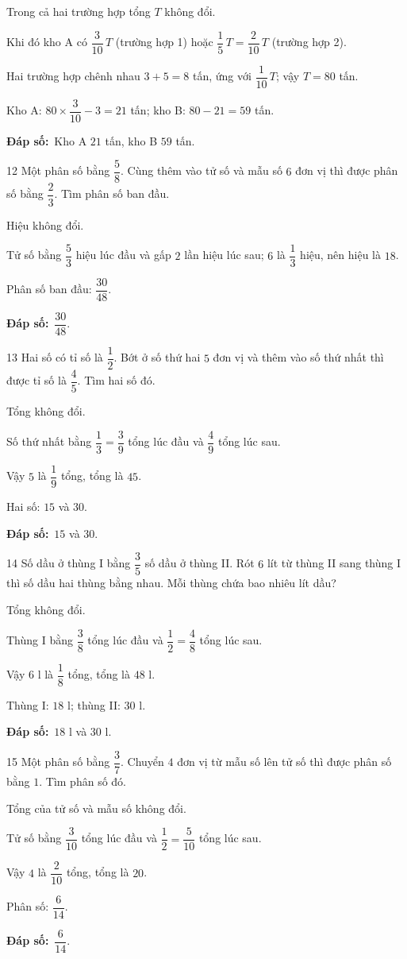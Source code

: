 \documentclass[11pt]{article}
\newif\ifsol \solfalse
\providecommand{\AnsWord}{Đáp số}
\newcommand{\dapso}[1]{\par\textbf{\AnsWord:}\ #1}
\newcommand{\probsol}[1]{%
  \begin{lrbox}{\solmeasure}\begin{minipage}{\dimexpr\linewidth-24pt\relax}#1\end{minipage}\end{lrbox}%
  \ifsol
    \begin{solbox}#1\end{solbox}%
  \else
    \setlength{\solht}{\dimexpr\ht\solmeasure+\dp\solmeasure+0.85cm\relax}%
    \ifdim\solht<1.35cm\setlength{\solht}{1.35cm}\fi
    \begin{tcolorbox}[colback=white,colframe=Line,boxrule=0.8pt,arc=5pt,
      left=8pt,right=8pt,top=4pt,bottom=4pt,height=\solht]{\footnotesize\color{Slate}\itshape\WorkWord}\end{tcolorbox}%
  \fi}
\newcommand{\gap}{\vspace{0.3cm}}
\def\WorkWord{Bài làm:}
\def\AnsWord{Đáp số}
\begin{document}
\probsol{
Trong cả hai trường hợp tổng $T$ không đổi.\par Khi đó kho A có $\dfrac3{10}\,T$ (trường hợp 1) hoặc $\dfrac15\,T=\dfrac2{10}\,T$ (trường hợp 2).\par
Hai trường hợp chênh nhau $3+5=8$ tấn, ứng với $\dfrac1{10}\,T$; vậy $T=80$ tấn.\par
Kho A: $80\times\dfrac3{10}-3=21$ tấn; kho B: $80-21=59$ tấn.
\dapso{Kho A $21$ tấn, kho B $59$ tấn.}}
\gap
\begin{probbox}{12}{\relax}
Một phân số bằng $\dfrac58$. Cùng thêm vào tử số và mẫu số $6$ đơn vị thì được phân số bằng $\dfrac23$. Tìm phân số ban đầu.
\end{probbox}
\probsol{
Hiệu không đổi.\par Tử số bằng $\dfrac53$ hiệu lúc đầu và gấp $2$ lần hiệu lúc sau; $6$ là $\dfrac13$ hiệu, nên hiệu là $18$.\par
Phân số ban đầu: $\dfrac{30}{48}$.
\dapso{$\dfrac{30}{48}$.}}
\gap
\begin{probbox}{13}{\relax}
Hai số có tỉ số là $\dfrac12$. Bớt ở số thứ hai $5$ đơn vị và thêm vào số thứ nhất thì được tỉ số là $\dfrac45$. Tìm hai số đó.
\end{probbox}
\probsol{
Tổng không đổi.\par Số thứ nhất bằng $\dfrac13=\dfrac39$ tổng lúc đầu và $\dfrac49$ tổng lúc sau.\par Vậy $5$ là $\dfrac19$ tổng, tổng là $45$.\par Hai số: $15$ và $30$.
\dapso{$15$ và $30$.}}
\gap
\begin{probbox}{14}{\relax}
Số dầu ở thùng I bằng $\dfrac35$ số dầu ở thùng II. Rót $6$ lít từ thùng II sang thùng I thì số dầu hai thùng bằng nhau. Mỗi thùng chứa bao nhiêu lít dầu?
\end{probbox}
\probsol{
Tổng không đổi.\par Thùng I bằng $\dfrac38$ tổng lúc đầu và $\dfrac12=\dfrac48$ tổng lúc sau.\par Vậy $6$ l là $\dfrac18$ tổng, tổng là $48$ l.\par Thùng I: $18$ l; thùng II: $30$ l.
\dapso{$18$ l và $30$ l.}}
\gap
\begin{probbox}{15}{\relax}
Một phân số bằng $\dfrac37$. Chuyển $4$ đơn vị từ mẫu số lên tử số thì được phân số bằng $1$. Tìm phân số đó.
\end{probbox}
\probsol{
Tổng của tử số và mẫu số không đổi.\par Tử số bằng $\dfrac3{10}$ tổng lúc đầu và $\dfrac12=\dfrac5{10}$ tổng lúc sau.\par Vậy $4$ là $\dfrac2{10}$ tổng, tổng là $20$.\par Phân số: $\dfrac6{14}$.
\dapso{$\dfrac6{14}$.}}
\end{document}
